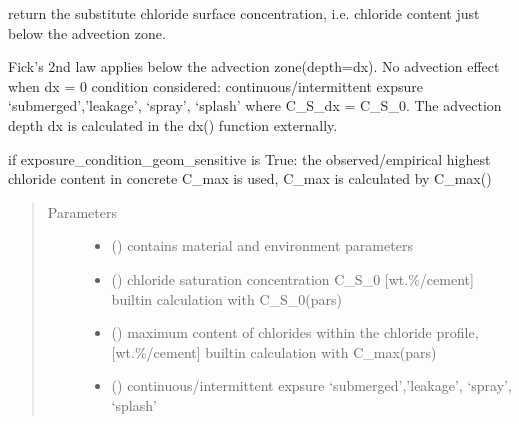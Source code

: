 \documentclass[letterpaper,10pt,english]{sphinxmanual}
\begin{document}

\begin{fulllineitems}
\label{\detokenize{chloride:chloride.C_S_dx}}
\sphinxAtStartPar
return the substitute chloride surface concentration, i.e. chloride content just below the advection zone.

\sphinxAtStartPar
Fick’s 2nd law applies below the advection zone(depth=dx). No advection effect when dx = 0
condition considered: continuous/intermittent expsure \sphinxhyphen{} ‘submerged’,’leakage’, ‘spray’, ‘splash’ where C\_S\_dx = C\_S\_0.
The advection depth dx is calculated in the dx() function externally.

\sphinxAtStartPar
if exposure\_condition\_geom\_sensitive is True: the observed/empirical highest chloride content in concrete C\_max is used, C\_max is calculated by C\_max()
\begin{quote}\begin{description}
\item[{Parameters}] \leavevmode\begin{itemize}
\item {} 
\sphinxAtStartPar
{} () \textendash{} contains material and environment parameters

\item {} 
\sphinxAtStartPar
{} () \textendash{} chloride saturation concentration C\_S\_0 {[}wt.\sphinxhyphen{}\%/cement{]}
built\sphinxhyphen{}in calculation with C\_S\_0(pars)

\item {} 
\sphinxAtStartPar
{} () \textendash{} maximum content of chlorides within the chloride profile, {[}wt.\sphinxhyphen{}\%/cement{]}
built\sphinxhyphen{}in calculation with C\_max(pars)

\item {} 
\sphinxAtStartPar
{} () \textendash{} continuous/intermittent expsure \sphinxhyphen{} ‘submerged’,’leakage’, ‘spray’, ‘splash’


\end{itemize}
\end{description}
\end{quote}
\end{fulllineitems}
\end{document}
